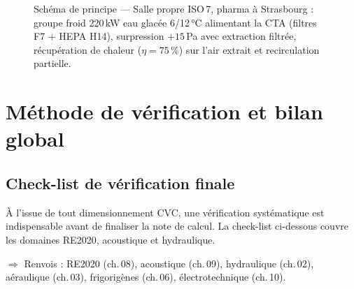 \begin{figure}[H]
  \caption{Schéma de principe — Salle propre ISO\,7, pharma à Strasbourg :
    groupe froid 220\,kW eau glacée 6/12\,°C alimentant la CTA (filtres F7 + HEPA H14),
    surpression $+15$\,Pa avec extraction filtrée,
    récupération de chaleur ($\eta = 75\,\%$) sur l'air extrait et recirculation partielle.}
\end{figure}

\section{Méthode de vérification et bilan global}

\subsection{Check-list de vérification finale}

À l'issue de tout dimensionnement CVC, une vérification systématique est indispensable
avant de finaliser la note de calcul. La check-list ci-dessous couvre les domaines RE2020,
acoustique et hydraulique.

\noindent\textcolor{FedBlue!70!black}{\textsf{\small$\Rightarrow$ Renvois : RE2020 (ch.\,08), acoustique (ch.\,09), hydraulique (ch.\,02), aéraulique (ch.\,03), frigorigènes (ch.\,06), électrotechnique (ch.\,10).}}


